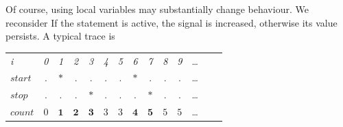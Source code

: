 Of course, using local variables may substantially change behaviour. We
reconsider
%
%
If the  statement is active, the signal  is increased,
otherwise its value persists. A typical trace is
\begin{center}
  \leavevmode
  \begin{tabular}[]{l@{\quad}||@{\quad}ccccccccccccc}
    \hline\hline
     \hbox{{\footnotesize \textit{i}}} &{\footnotesize \textit{0}}
     &{\footnotesize \textit{1}}&{\footnotesize \textit{2}}
     &{\footnotesize \textit{3}}&{\footnotesize \textit{4}}
     &{\footnotesize \textit{5}}&{\footnotesize \textit{6}}
     &{\footnotesize \textit{7}}&{\footnotesize \textit{8}}
     &{\footnotesize \textit{9}}&\ldots
   \\      
    \hbox{$start$} &.&$*$&.&.&.&.&$*$&.&.&.&\ldots
   \\
    \hbox{$stop$} &.&.&.&$*$&.&.&.&$*$&.&.&\ldots
   \\     
   \hbox{$count$} &$\mathit{0}$&$\mathbf{1}$&$\mathbf{2}$&
   $\mathbf{3}$&$\mathit{3}$&$\mathit{3}$&
   $\mathbf{4}$&$\mathbf{5}$&$\mathit{5}$&$\mathit{5}$&\ldots
   \\ 
  \hline\hline
  \end{tabular}
\end{center}

